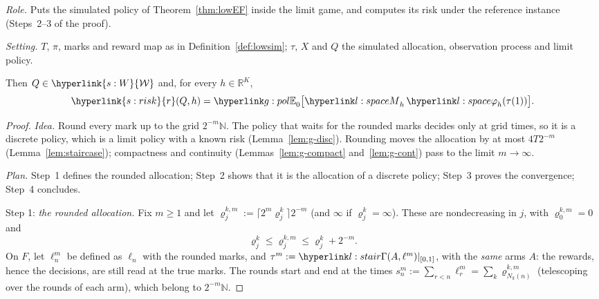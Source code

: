 \documentclass[11pt]{article}
\DeclareRobustCommand{\sy}[2]{{\hyperlink{#1}{#2}}}
\newcommand{\R}{\mathbb{R}}
\newcommand{\Nat}{\mathbb{N}}
\newcommand{\1}{\mathbf{1}}
\newcommand{\Wc}{\sy{s:W}{\mathcal W}}
\newcommand{\rk}{\sy{s:risk}{r}}
\begin{document}
\begin{lemma}\label{lem:simW}
\textit{Role.} Puts the simulated policy of Theorem~\ref{thm:lowEF} inside the limit game, and computes its risk under the reference instance (Steps~2--3 of the proof).

\noindent\textit{Setting.} $T$, $\pi$, marks and reward map as in Definition~\ref{def:lowsim}; $\tau$, $X$ and $Q$ the simulated allocation, observation process and limit
policy.

\noindent Then $Q\in\Wc$ and, for every $h\in\R^K$,
\[
\rk(Q,h)=\gEh_0\big[\lM_h\,\lphi_h(\tau(1))\big].
\]
\end{lemma}
\begin{proof}
\textit{Idea.} Round every mark up to the grid $2^{-m}\Nat$. The policy that waits for the rounded marks decides only at grid times, so it is a discrete policy, which is
a limit policy with a known risk (Lemma~\ref{lem:g-disc}). Rounding moves the allocation by at most $4T2^{-m}$ (Lemma~\ref{lem:staircase}); compactness and continuity
(Lemmas~\ref{lem:g-compact} and~\ref{lem:g-cont}) pass to the limit $m\to\infty$.

\textit{Plan.} Step~1 defines the rounded allocation; Step~2 shows that it is the allocation of a discrete policy; Step~3 proves the convergence; Step~4 concludes.

Step 1: \emph{the rounded allocation.} Fix $m\ge1$ and let $\varrho^{k,m}_j:=\lceil2^m\varrho^k_j\rceil2^{-m}$ (and $\infty$ if $\varrho^k_j=\infty$). These are
nondecreasing in $j$, with $\varrho^{k,m}_0=0$ and
\[
\varrho^k_j\le\varrho^{k,m}_j\le\varrho^k_j+2^{-m}.
\]
On $F$, let $\ell^m_n$ be defined as $\ell_n$ with the rounded marks, and $\tau^m:=\lGam(A,\ell^m)|_{[0,1]}$, with the \emph{same} arms $A$: the rewards, hence the
decisions, are still read at the true marks. The rounds start and end at the times $s^m_n:=\sum_{r<n}\ell^m_r=\sum_k\varrho^{k,m}_{N_k(n)}$ (telescoping over the rounds of
each arm), which belong to $2^{-m}\Nat$.


\end{proof}
\end{document}
